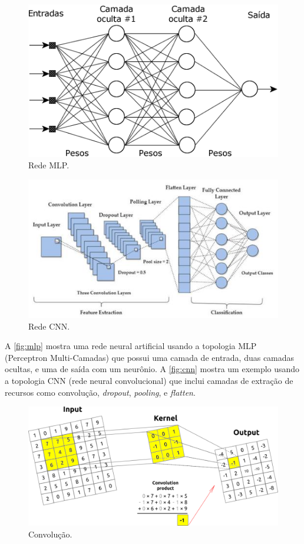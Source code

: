 \documentclass[sigconf, nonacm, screen]{acmart}
\begin{document}
\begin{figure}[ht]
	\centering
	\includegraphics[width=0.9\linewidth]{img/mlp}
	\caption{Rede MLP.}
	\label{fig:mlp}
\end{figure}

\begin{figure}[ht]
	\centering
	\includegraphics[width=\linewidth]{img/cnn}
	\caption{Rede CNN.}
	\label{fig:cnn}
\end{figure}

A \autoref{fig:mlp} mostra uma rede neural artificial usando a topologia MLP (Perceptron Multi-Camadas) que possui uma camada de entrada, duas camadas ocultas, e uma de saída com um neurônio. A \autoref{fig:cnn} mostra um exemplo usando a topologia CNN (rede neural convolucional) que inclui camadas de extração de recursos como convolução, \textit{dropout}, \textit{pooling}, e \textit{flatten}.

\begin{figure}[ht]
	\centering
	\includegraphics[width=\linewidth]{img/convolucao}
	\caption{Convolução.}
	\label{fig:convolucao}
\end{figure}
\end{document}
